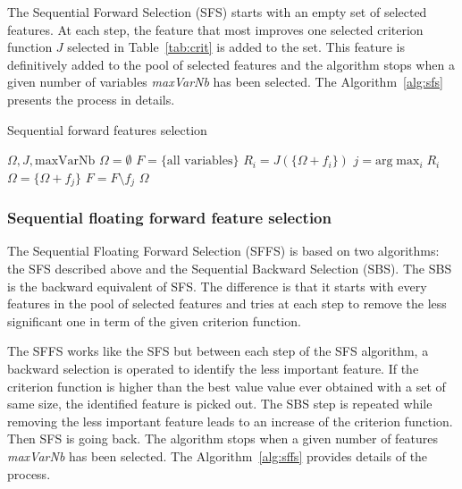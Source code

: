 \documentclass[journal,peerreview,onecolumn]{IEEEtran}
\begin{document}
        The Sequential Forward Selection (SFS) starts with an empty set of selected features.  At each  step, the feature that most  improves one selected criterion function $J$ selected in Table~\ref{tab:crit} is added  to the set. This feature is definitively added to the pool of selected features and the algorithm stops when a given number of variables \emph{maxVarNb} has been selected. The Algorithm~\ref{alg:sfs} presents the process in details.

        \begin{algorithm}
        \caption{Sequential forward features selection\label{alg:sfs}}
        {\footnotesize
        \begin{algorithmic}[1]
        \REQUIRE $\Omega,J,\text{maxVarNb}$
        \STATE $\Omega=\emptyset$
        \STATE $F=\text{\{all variables\}}$
        \STATE $R_i = J(\{\Omega + f_i\})$
        \ENDFOR
        \STATE $j=\text{arg} \max_{i} R_i$
        \STATE $\Omega = \{\Omega + f_j\}$
        \STATE $F = F \setminus f_j$
        \ENDWHILE
        \RETURN $\Omega$
        \end{algorithmic}
        }
        \end{algorithm}

        \subsubsection{Sequential floating forward feature selection}
        \label{sec:floating-presentation}

        The Sequential Floating Forward Selection (SFFS)\cite{somol1999adaptive} is based on two algorithms: the SFS described above and the Sequential Backward Selection (SBS). The SBS is the backward equivalent of SFS. The difference is that it starts with every features in the pool of selected features and tries at each step to remove the less significant one in term of the given criterion function.

        The SFFS works like the SFS but between each step of the SFS algorithm, a backward selection is operated to identify the less important feature. If the criterion function is higher than the best value value ever obtained with a set of same size, the identified feature is picked out. The SBS step is repeated while removing the less important feature leads to an increase of the criterion function. Then SFS is going back. The algorithm stops when a given number of features \emph{maxVarNb} has been selected. The Algorithm~\ref{alg:sffs} provides details of the process.
\end{document}
